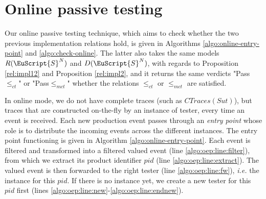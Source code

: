 \section{Online passive testing}
\label{sec:testing:online}


Our online passive testing technique, which aims to check whether
the two previous implementation relations hold, is given in
Algorithms \ref{algo:online-entry-point} and
\ref{algo:check-online}. The latter also takes the same models
$R(\EuScript{S}^{N})$ and $D(\EuScript{S}^{N})$, with regards to
Proposition \ref{rel:impl12} and Proposition \ref{rel:impl2}, and
it returns the same verdicts "Pass$\leq_{ct}$" or
"Pass$\leq_{mct}$" whether the relations $\leq_{ct}$ or
$\leq_{mct}$ are satisfied.

In online mode, we do not have complete traces (such as
$CTraces({Sut})$), but traces that are constructed on-the-fly by
an instance of tester, every time an event is received. Each new
production event passes through an \emph{entry point} whose role
is to distribute the incoming events across the different
instances. The entry point functioning is given in Algorithm
\ref{algo:online-entry-point}. Each event is filtered and
transformed into a filtered valued event (line
\ref{algo:oep:line:filter}), from which we extract its product
identifier $pid$ (line \ref{algo:oep:line:extract}).  The valued
event is then forwarded to the right tester (line
\ref{algo:oep:line:fw}), \emph{i.e.} the instance for this $pid$.
If there is no instance yet, we create a new tester for this
$pid$ first (lines
\ref{algo:oep:line:new}-\ref{algo:oep:line:endnew}).

